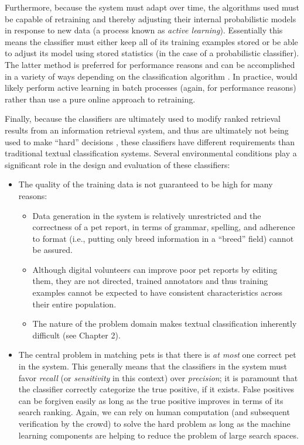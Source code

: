 Furthermore, because the system must adapt over time, the algorithms used must be capable of retraining and thereby adjusting their internal probabilistic models in response to new data (a process known as {\em active learning}).  Essentially this means the classifier must either keep all of its training examples stored or be able to adjust its model using stored statistics (in the case of a probabilistic classifier).  The latter method is preferred for performance reasons and can be accomplished in a variety of ways depending on the classification algorithm \cite{jurafsky:nlp, sebastiani:ml}.  In practice, \nplh{} would likely perform active learning in batch processes (again, for performance reasons) rather than use a pure online approach to retraining.

Finally, because the classifiers are ultimately used to modify ranked retrieval results from an information retrieval system, and thus are ultimately not being used to make ``hard'' decisions \cite{sebastiani:ml}, these classifiers have different requirements than traditional textual classification systems.  Several environmental conditions play a significant role in the design and evaluation of these classifiers:

\begin{itemize}
  \item{} The quality of the training data is not guaranteed to be high for many reasons: 
  \begin{itemize}
  		\item{} Data generation in the system is relatively unrestricted and the correctness of a pet report, in terms of grammar, spelling, and adherence to format (i.e., putting only breed information in a ``breed'' field) cannot be assured.  
  		\item{} Although digital volunteers can improve poor pet reports by editing them, they are not directed, trained annotators and thus training examples cannot be expected to have consistent characteristics across their entire population.  
  		\item{} The nature of the problem domain makes textual classification inherently difficult (see Chapter 2).  
  \end{itemize}
  \item{} The central problem in matching pets is that there is {\em at most} one correct pet in the system.  This generally means that the classifiers in the system must favor {\em recall} (or {\em sensitivity} in this context) over {\em precision}; it is paramount that the classifier correctly categorize the true positive, if it exists.  False positives can be forgiven easily as long as the true positive improves in terms of its search ranking.  Again, we can rely on human computation (and subsequent verification by the crowd) to solve the hard problem as long as the machine learning components are helping to reduce the problem of large search spaces.
\end{itemize}

